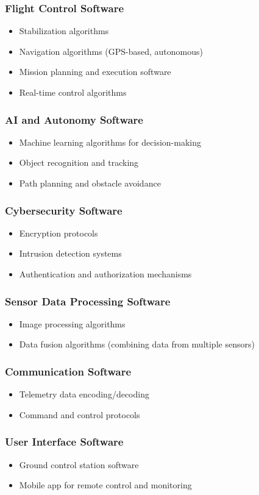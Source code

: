 \subsubsection{Flight Control Software}
\begin{itemize}
    \item Stabilization algorithms
    \item Navigation algorithms (GPS-based, autonomous)
    \item Mission planning and execution software
    \item Real-time control algorithms
\end{itemize}

\subsubsection{AI and Autonomy Software}
\begin{itemize}
    \item Machine learning algorithms for decision-making
    \item Object recognition and tracking
    \item Path planning and obstacle avoidance
\end{itemize}

\subsubsection{Cybersecurity Software}
\begin{itemize}
    \item Encryption protocols
    \item Intrusion detection systems
    \item Authentication and authorization mechanisms
\end{itemize}

\subsubsection{Sensor Data Processing Software}
\begin{itemize}
    \item Image processing algorithms
    \item Data fusion algorithms (combining data from multiple sensors)
\end{itemize}

\subsubsection{Communication Software}
\begin{itemize}
    \item Telemetry data encoding/decoding
    \item Command and control protocols
\end{itemize}

\subsubsection{User Interface Software}
\begin{itemize}
    \item Ground control station software
    \item Mobile app for remote control and monitoring
\end{itemize}

